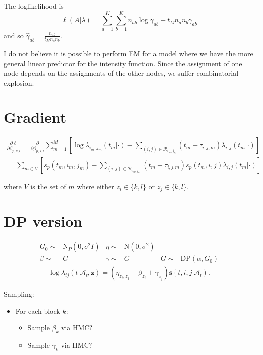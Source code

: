 \documentclass[11pt]{article}
\begin{document}
The loglikelihood is $$\ell(A|\lambda) = \sum_{a=1}^K \sum_{b=1}^K n_{ab} \log \gamma_{ab} - t_M n_a n_b \gamma_{ab}$$
and so $\hat{\gamma}_{ab} = \frac{n_{ab}}{t_Mn_an_b}$.


I do not believe it is possible to perform EM for a model where we have the more general linear predictor for the intensity function.  Since the assignment of one node depends on the assignments of the other nodes, we suffer combinatorial explosion.

\section{Gradient}

\begin{align*}
\frac{\partial \ell}{\partial \beta_{p,k,l}} = \frac{\partial}{\partial \beta_{p,k,l}} \sum_{m = 1}^M \left[ \log \lambda_{i_m,j_m}(t_m | \cdot) - \sum_{(i,j) \in \mathcal{R}_{i_m,j_m}} (t_m-\tau_{i,j,m}) \lambda_{i,j}(t_m|\cdot) \right] \\ 
  =\sum_{m \in V} \left[ s_p(t_m,i_m,j_m) - \sum_{(i,j) \in \mathcal{R}_{i_m,j_m}} (t_m-\tau_{i,j,m}) s_p(t_m,i,j) \lambda_{i,j}(t_m|\cdot) \right]
\end{align*}

where $V$ is the set of $m$ where either $z_i \in \{k,l\}$ or $z_j \in \{k,l\}$.

\section{DP version}
\begin{align*}
G_0 \sim& \mbox{N}_P(0,\sigma^2 I) & \eta \sim &
\mbox{N}(0,\sigma^2)  & &\\
\beta \sim& G & \gamma \sim& G & G \sim& \mbox{DP}(\alpha,G_0)
\end{align*}
\begin{align*}
\log \lambda_{ij}(t | \mathcal{A}_t,\mathbf{z}) =
(\eta_{z_i,z_j} + \beta_{z_i} + \gamma_{z_j}) \mathbf{s}(t,i,j|\mathcal{A}_t).
\end{align*}

Sampling:
\begin{itemize}
\item For each block $k$:
  \begin{itemize}
  \item Sample $\beta_k$ via HMC?
  \item Sample $\gamma_k$ via HMC?
  \end{itemize}
\end{itemize}



\end{document}
